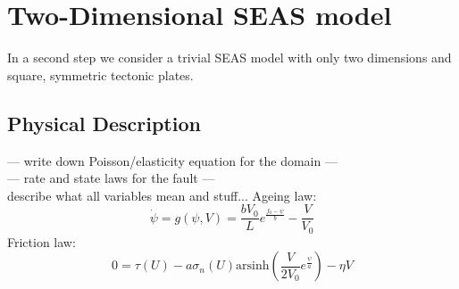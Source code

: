 \documentclass{report}
\begin{document}

\chapter{Two-Dimensional SEAS model}
In a second step we consider a trivial SEAS model with only two dimensions and square, symmetric tectonic plates.

\section{Physical Description}
\label{ssec:physicalDescriptionSEAS2D}
--- write down Poisson/elasticity equation for the domain --- \\
--- rate and state laws for the fault --- \\
describe what all variables mean and stuff...
Ageing law: 
\begin{equation}
    \dot{\psi} = g(\psi, V) = \frac{bV_0}{L}e^{\frac{f_0 - \psi}{b}} - \frac{V}{V_0}
\end{equation}
Friction law: 
\begin{equation}
    0 = \tau(U) - a\sigma_n(U) \text{arsinh}\left(\frac{V}{2V_0}e^{\frac{\psi}{a}}\right) - \eta V
\end{equation}
\end{document}
